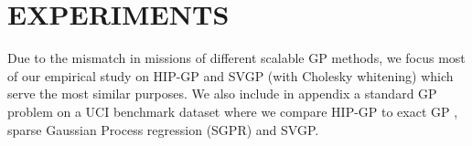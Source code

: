 \section{EXPERIMENTS}
Due to the mismatch in missions of different scalable GP methods,
we focus most of our empirical study on HIP-GP and SVGP (with Cholesky whitening)
which serve the most similar purposes. We also include in appendix a standard GP problem on a UCI benchmark dataset \citep{Dua:2019} where we compare HIP-GP to exact GP \citep{wang2019exact}, sparse Gaussian Process regression (SGPR) \citep{titsias2009variational} and SVGP.







\iffalse
\subsection{Standard GP Study}
The main goal of this section is to investigate the predictive accuracy and
the speed of the HIP-GP in standard GP problems of moderate-sized dataset
($N <$ 200{,}000).
We use SVGP with Cholesky whitening strategy as baseline. For all experiments,
we fix the same hyper-parameters for HIPGP and SVGP; and we fix the number of PCG
iterations to $20$ for training and $50$ for evaluation for HIPGP.


\fi

%




